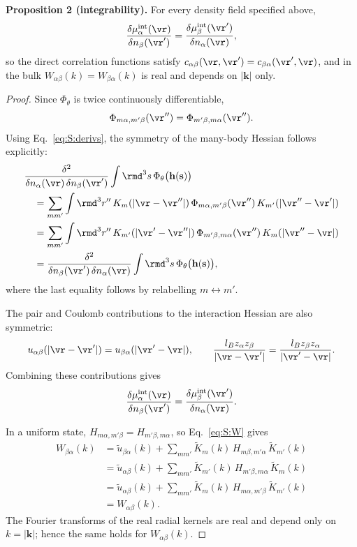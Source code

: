 \textbf{Proposition 2 (integrability).} For every density field specified above,
\begin{equation}
\frac{\delta\mu^{\rm int}_\alpha(\vr)}{\delta n_\beta(\vr')}=\frac{\delta\mu^{\rm int}_\beta(\vr')}{\delta n_\alpha(\vr)},
\end{equation}
so the direct correlation functions satisfy $c_{\alpha\beta}(\vr,\vr')=c_{\beta\alpha}(\vr',\vr)$, and in the bulk $W_{\alpha\beta}(k)=W_{\beta\alpha}(k)$ is real and depends on $|\mathbf k|$ only.

\begin{proof}
    Since $\Phi_\theta$ is twice continuously differentiable,
\[
\Phi_{m\alpha,m'\beta}(\vr'')
=
\Phi_{m'\beta,m\alpha}(\vr'').
\]
Using Eq.~\ref{eq:S:derivs}, the symmetry of the many-body
Hessian follows explicitly:
\[
\begin{aligned}
&\frac{\delta^2}{\delta n_\alpha(\vr)\,\delta n_\beta(\vr')}
\int \rmd^3s\,\Phi_\theta\big(\mathbf h(\mathbf s)\big)\\
&\quad=
\sum_{mm'}\int \rmd^3r''\,
K_m(|\vr-\vr''|)\,
\Phi_{m\alpha,m'\beta}(\vr'')\,
K_{m'}(|\vr''-\vr'|)\\
&\quad=
\sum_{mm'}\int \rmd^3r''\,
K_{m'}(|\vr'-\vr''|)\,
\Phi_{m'\beta,m\alpha}(\vr'')\,
K_m(|\vr''-\vr|)\\
&\quad=
\frac{\delta^2}{\delta n_\beta(\vr')\,\delta n_\alpha(\vr)}
\int \rmd^3s\,\Phi_\theta\big(\mathbf h(\mathbf s)\big),
\end{aligned}
\]
where the last equality follows by relabelling $m\leftrightarrow m'$.

The pair and Coulomb contributions to the interaction Hessian
are also symmetric:
\[
u_{\alpha\beta}(|\vr-\vr'|)
=
u_{\beta\alpha}(|\vr'-\vr|),
\qquad
\frac{l_Bz_\alpha z_\beta}{|\vr-\vr'|}
=
\frac{l_Bz_\beta z_\alpha}{|\vr'-\vr|}.
\]
Combining these contributions gives
\[
\frac{\delta\mu^{\rm int}_\alpha(\vr)}
     {\delta n_\beta(\vr')}
=
\frac{\delta\mu^{\rm int}_\beta(\vr')}
     {\delta n_\alpha(\vr)}.
\]

In a uniform state, $H_{m\alpha,m'\beta}=H_{m'\beta,m\alpha}$,
so Eq.~\ref{eq:S:W} gives
\[
\begin{aligned}
W_{\beta\alpha}(k)
&=
\tilde u_{\beta\alpha}(k)
+\sum_{mm'}\tilde K_m(k)\,
H_{m\beta,m'\alpha}\,\tilde K_{m'}(k)\\
&=
\tilde u_{\alpha\beta}(k)
+\sum_{mm'}\tilde K_{m'}(k)\,
H_{m'\beta,m\alpha}\,\tilde K_m(k)\\
&=
\tilde u_{\alpha\beta}(k)
+\sum_{mm'}\tilde K_m(k)\,
H_{m\alpha,m'\beta}\,\tilde K_{m'}(k)\\
&=W_{\alpha\beta}(k).
\end{aligned}
\]
The Fourier transforms of the real radial kernels are real
and depend only on $k=|\mathbf k|$; hence the same holds for
$W_{\alpha\beta}(k)$. 
\end{proof}



